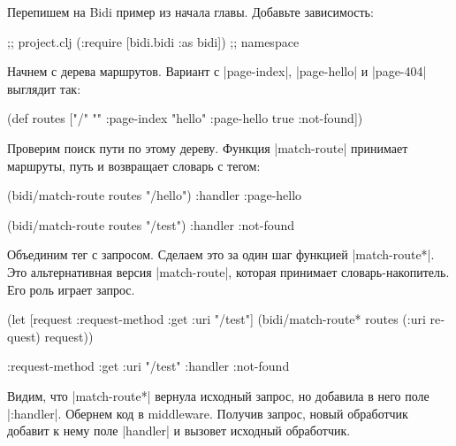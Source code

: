 Перепишем на Bidi пример из начала главы. Добавьте зависимость:

\begin{english}
  \begin{clojure}
[bidi "2.1.5"]                  ;; project.clj
(:require [bidi.bidi :as bidi]) ;; namespace
  \end{clojure}
\end{english}

Начнем с дерева маршрутов. Вариант с \spverb|page-index|, \spverb|page-hello| и
\spverb|page-404| выглядит так:

\begin{english}
  \begin{clojure}
(def routes
  ["/" {""      :page-index
        "hello" :page-hello
        true    :not-found}])
  \end{clojure}
\end{english}


Проверим поиск пути по этому дереву. Функция \spverb|match-route| принимает
маршруты, путь и возвращает словарь с тегом:

\begin{english}
  \begin{clojure}
(bidi/match-route routes "/hello")
{:handler :page-hello}

(bidi/match-route routes "/test")
{:handler :not-found}
  \end{clojure}
\end{english}


Объединим тег с запросом. Сделаем это за один шаг функцией
\spverb|match-route*|. Это альтернативная версия \spverb|match-route|, которая
принимает словарь-накопитель. Его роль играет запрос.

\begin{english}
  \begin{clojure}
(let [request {:request-method :get
               :uri "/test"}]
  (bidi/match-route* routes (:uri request) request))

{:request-method :get
 :uri "/test"
 :handler :not-found}
  \end{clojure}
\end{english}

Видим, что \spverb|match-route*| вернула исходный запрос, но добавила в него
поле \spverb|:handler|. Обернем код в middleware. Получив запрос, новый
обработчик добавит к нему поле \spverb|handler| и вызовет исходный обработчик.

